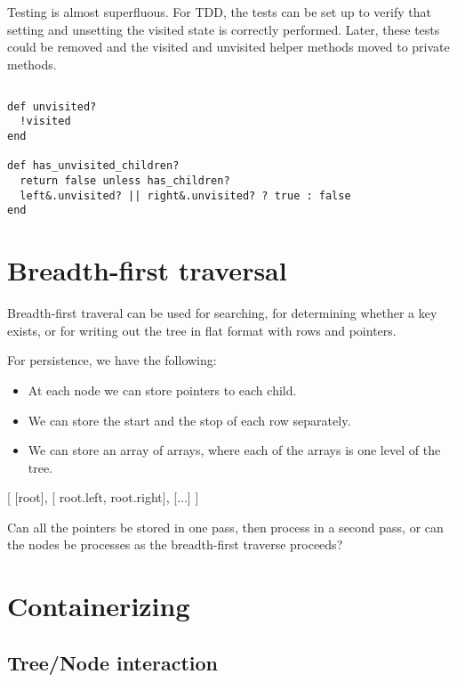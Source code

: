 \documentclass{article}
\begin{document}
Testing is almost superfluous. For TDD, the tests can be set up
to verify that setting and unsetting the visited state is correctly
performed. Later, these tests could be removed and the visited and
unvisited helper methods moved to private methods.

\subsection{}

\begin{lstlisting}[frame=single,title=Helper methods for determining child's status.]
def unvisited?
  !visited
end

def has_unvisited_children?
  return false unless has_children?
  left&.unvisited? || right&.unvisited? ? true : false
end
\end{lstlisting}

\section{Breadth-first traversal}

Breadth-first traveral can be used for searching, for determining whether a key exists,
or for writing out the tree in flat format with rows and pointers.

For persistence, we have the following:

\begin{itemize}
\item At each node we can store pointers to each child.
\item We can store the start and the stop of each row separately.
\item We can store an array of arrays, where each of the arrays is
      one level of the tree.
\end{itemize}

[
 [root],
 [ root.left, root.right],
 [...]
]

Can all the pointers be stored in one pass, then process in a second pass,
or can the nodes be processes as the breadth-first traverse proceeds?


\section{Containerizing}

\subsection{Tree/Node interaction}
\end{document}

